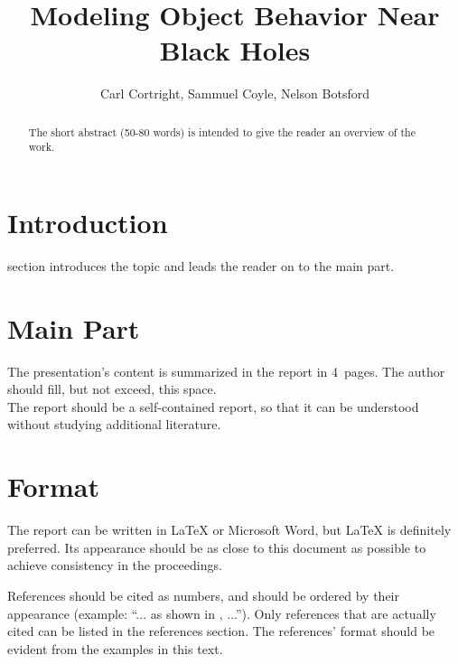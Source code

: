 \documentclass[journal, a4paper]{IEEEtran}
\begin{document}
\title{Modeling Object Behavior Near Black Holes}
\author{Carl Cortright, Sammuel Coyle, Nelson Botsford}
\maketitle

\begin{abstract}
  The short abstract (50-80 words) is intended to give the reader an overview of the work.
\end{abstract}

\section{Introduction}
 section introduces the topic and leads the reader on to the main part.

\section{Main Part}
The presentation's content is summarized in the report in 4~pages.
The author should fill, but not exceed, this space. \\
The report should be a self-contained report, so that it can be understood without studying additional literature.

\section{Format}
The report can be written in \LaTeX{} or Microsoft Word, but \LaTeX{} is definitely preferred.
Its appearance should be as close to this document as possible to achieve consistency in the proceedings.

References should be cited as numbers, and should be ordered by their appearance (example: ``... as shown in \cite{HOP96}, ...'').
Only references that are actually cited can be listed in the references section.
The references' format should be evident from the examples in this text.
\end{document}
